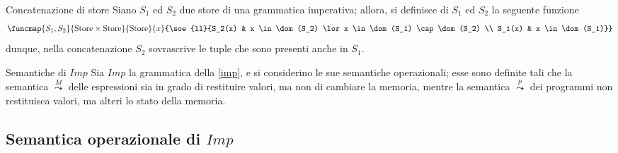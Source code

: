 \documentclass[a4paper, 12pt]{report}
\begin{document}
    \begin{frameddefn}{Concatenazione di store}
        Siano $S_1$ ed $S_2$ due store di una grammatica imperativa; allora, si definisce  di $S_1$ ed $S_2$ la seguente funzione $$\funcmap{S_1, S_2}{\mathrm{Store} \times \mathrm{Store}}{\mathrm{Store}}{x}{\soe{ll}{S_2(x) & x \in \dom(S_2) \lor x \in \dom(S_1) \cap \dom(S_2) \\ S_1(x) & x \in \dom(S_1)}}$$ dunque, nella concatenazione $S_2$ sovrascrive le tuple che sono presenti anche in $S_1$.
    \end{frameddefn}

    \begin{framedobs}{Semantiche di $Imp$}
        Sia $Imp$ la grammatica della \cref{imp}, e si considerino le sue semantiche operazionali; esse sono definite tali che la semantica $\stackrel{M}{\leadsto}$ delle espressioni sia in grado di restituire valori, ma non di cambiare la memoria, mentre la semantica $\stackrel{p}{\leadsto}$ dei programmi non restituisca valori, ma alteri lo stato della memoria. 
    \end{framedobs}

    \subsection{Semantica operazionale di $Imp$}
\end{document}
